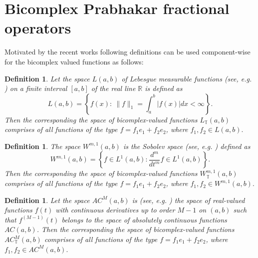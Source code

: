 \documentclass[a4paper,12pt]{article}
\newtheorem{definition}[theorem]{Definition}
\theoremstyle{remark}
\begin{document}
\section{Bicomplex  Prabhakar fractional operators}
Motivated by the recent  works %
\cite{toksoy2024geometrical,toksoy2024hyperbolic,dubey2014note} following definitions  can be used component-wise for the bicomplex valued functions as follows:
\begin{definition}\label{def:lebesgur}
Let	the space $L(a, b)$ of Lebesgue measurable 	functions (see, e.g. \cite{kilbas2004generalized}) on a finite interval $[a, b]$ of the real line $\mathbb{R}$ is defined as 
	\begin{equation}
	L(a,b) =\left\lbrace f(x): ~  \parallel f \parallel _1=\int_{a}^{b}|f(x)|dx<\infty \right\rbrace .
	\end{equation}
       Then the corresponding  the space of bicomplex-valued functions $L_\mathbb{T}(a,b)$ comprises of all functions of the type 	\(f = f_1 e_1 + f_2 e_2\), where $f_1,f_2 \in L(a,b).$
\end{definition}
\begin{definition}
   The space $W^{m,1}(a,b)$  is the Sobolev
space (see, e.g. 	\cite{polito2016some}) defined as
\begin{equation}
    W^{m,1}(a,b)=\left\lbrace f\in L^1(a,b):\frac{d^m}{dt^m}f\in L^1(a,b)\right\rbrace. 
\end{equation}
 Then the corresponding  the space of bicomplex-valued functions $W_{\mathbb{T}}^{m,1}(a,b)$ comprises of all functions of the type 	\(f = f_1 e_1 + f_2 e_2\), where $f_1,f_2 \in W^{m,1}(a,b).$
\end{definition}





\begin{definition}
	Let the space  $AC^M(a,b)$ is (see, e.g. 	\cite{polito2016some})  the space of real-valued functions $f(t)$ with 
	continuous derivatives up to order $M-1$ on $(a,b)$ such that $f^{ (M-1)} (t)$ belongs to the
	space of absolutely continuous functions $AC(a,b)$. 
    Then the corresponding  the space of bicomplex-valued functions $AC_\mathbb{T}^M(a,b)$ comprises of all functions of the type 	\(f = f_1 e_1 + f_2 e_2\), where $f_1,f_2 \in AC^M(a,b).$
    \end{definition}
\end{document}
